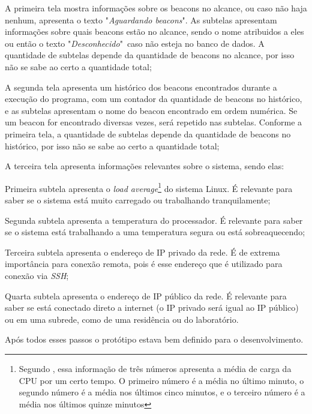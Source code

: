 \documentclass[
		12pt,				%
		openright,			%
		oneside,			%
		a4paper,			%
		chapter=TITLE,		%
		english,			%
		brazil				%
	]{abntex2}
\begin{document}
\begin{alineas}
	\item A primeira tela mostra informações sobre os beacons no alcance, ou caso não haja nenhum, apresenta o texto "\textit{Aguardando beacons}". As subtelas apresentam informações sobre quais beacons estão no alcance, sendo o nome atribuidos a eles ou então o texto "\textit{Desconhecido}"\ caso não esteja no banco de dados. A quantidade de subtelas depende da quantidade de beacons no alcance, por isso não se sabe ao certo a quantidade total;
	\item A segunda tela apresenta um histórico dos beacons encontrados durante a execução do programa, com um contador da quantidade de beacons no histórico, e as subtelas apresentam o nome do beacon encontrado em ordem numérica. Se um beacon for encontrado diversas vezes, será repetido nas subtelas. Conforme a primeira tela, a quantidade de subtelas depende da quantidade de beacons no histórico, por isso não se sabe ao certo a quantidade total;
	\item A terceira tela apresenta informações relevantes sobre o sistema, sendo elas:
	\begin{subalineas}
		\item Primeira subtela apresenta o \textit{load average}\footnote{Segundo , essa informação de três números apresenta a média de carga da CPU por um certo tempo. O primeiro número é a média no último minuto, o segundo número é a média nos últimos cinco minutos, e o terceiro número é a média nos últimos quinze minutos} do sistema Linux. É relevante para saber se o sistema está muito carregado ou trabalhando tranquilamente;
		\item Segunda subtela apresenta a temperatura do processador. É relevante para saber se o sistema está trabalhando a uma temperatura segura ou está sobreaquecendo;
		\item Terceira subtela apresenta o endereço de IP privado da rede. É de extrema importância para conexão remota, pois é esse endereço que é utilizado para conexão via \textit{SSH};
		\item Quarta subtela apresenta o endereço de IP público da rede. É relevante para saber se está conectado direto a internet (o IP privado será igual ao IP público) ou em uma subrede, como de uma residência ou do laboratório.
	\end{subalineas}
\end{alineas}

Após todos esses passos o protótipo estava bem definido para o desenvolvimento.
\end{document}
